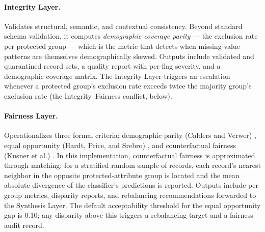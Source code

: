 \documentclass[11pt]{article}
\begin{document}
\paragraph{Integrity Layer.} Validates structural, semantic, and contextual consistency. Beyond standard schema validation, it computes \emph{demographic coverage parity} --- the exclusion rate per protected group --- which is the metric that detects when missing-value patterns are themselves demographically skewed. Outputs include validated and quarantined record sets, a quality report with per-flag severity, and a demographic coverage matrix. The Integrity Layer triggers an escalation whenever a protected group's exclusion rate exceeds twice the majority group's exclusion rate (the Integrity--Fairness conflict, below).

\paragraph{Fairness Layer.} Operationalizes three formal criteria: demographic parity (Calders and Verwer) \cite{calders2010naivebayes}, equal opportunity (Hardt, Price, and Srebro) \cite{hardt2016equality}, and counterfactual fairness (Kusner et al.) \cite{kusner2017counterfactual}. In this implementation, counterfactual fairness is approximated through matching: for a stratified random sample of records, each record's nearest neighbor in the opposite protected-attribute group is located and the mean absolute divergence of the classifier's predictions is reported. Outputs include per-group metrics, disparity reports, and rebalancing recommendations forwarded to the Synthesis Layer. The default acceptability threshold for the equal opportunity gap is 0.10; any disparity above this triggers a rebalancing target and a fairness audit record.
\end{document}
